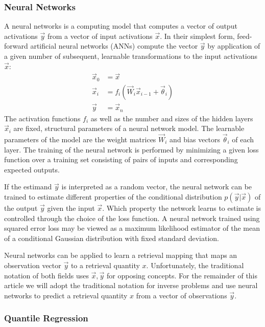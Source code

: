 \documentclass[journal abbreviation, manuscript]{copernicus}
\begin{document}
\subsubsection{Neural Networks}

  A neural networks is a computing model that computes a vector of output
  activations $\vec{y}$ from a vector of input activations $\vec{x}$. In their
  simplest form, feed-forward artificial neural networks (ANNs) compute the
  vector $\vec{y}$ by application of a given number of subsequent, learnable
  transformations to the input activations $\vec{x}$:
    \begin{align}
        \vec{x}_0 &= \vec{x}\\
        \vec{x}_i &= f_{i}
        \left ( \vec{W}_{i} \vec{x}_{i - 1}+ \vec{\theta}_i \right ) \\
        \vec{y} &= \vec{x}_{n}
    \end{align}
    The activation functions $f_i$ as well as the number and sizes of the
    hidden layers $\vec{x}_i$ are fixed, structural parameters of a neural
    network model. The learnable parameters of the model are the weight
    matrices $\vec{W}_i$ and bias vectors $\vec{\theta}_i$ of each layer. The
    training of the neural network is performed by minimizing a given loss
    function over a training set consisting of pairs of inputs and corresponding
    expected outputs.

    If the estimand $\vec{y}$ is interpreted as a random vector, the neural
    network can be trained to estimate different properties of the conditional
    distribution $p(\vec{y} | \vec{x})$ of the output $\vec{y}$ given the input
    $\vec{x}$. Which property the network learns to estimate is controlled
    through the choice of the loss function. A neural network trained using
    squared error loss may be viewed as a maximum likelihood estimator of the
    mean of a conditional Gaussian distribution with fixed standard deviation.

    Neural networks can be applied to learn a retrieval mapping
    that maps an observation vector $\vec{y}$ to a retrieval quantity $x$.
    Unfortunately, the traditional notation of both fields uses $\vec{x}, \vec{y}$
    for opposing concepts. For the remainder of this article we will adopt the
    traditional notation for inverse problems and use neural networks to predict
    a retrieval quantity $x$ from a vector of observations $\vec{y}$.

\subsubsection{Quantile Regression}
\end{document}
